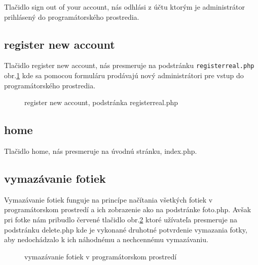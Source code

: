 Tlačidlo sign out of your account, nás odhlási z účtu ktorým je administrátor prihlásený do programátorského prostredia.

\pagebreak

\subsection{register new account}

Tlačidlo register new account, nás presmeruje na podstránku \verb|registerreal.php| obr.\ref{OBRAZOK 1.14} kde sa pomocou formuláru prodávajú nový administrátori pre vstup do programátorského prostredia.

\begin{figure}[!tbh]
\centering
\setlength{\fboxsep}{0pt}%
\setlength{\fboxrule}{1pt}%
\caption{register new account, podstránka registerreal.php}\label{OBRAZOK 1.14}
\end{figure}

\subsection{home}

Tlačidlo home, nás presmeruje na úvodnú stránku, index.php.

\subsection{vymazávanie fotiek}

Vymazávanie fotiek funguje na princípe načítania všetkých fotiek v programátorskom prostredí a ich zobrazenie ako na podstránke foto.php. Avšak pri fotke nám pribudlo červené tlačidlo obr.\ref{OBRAZOK 1.15} ktoré užívateľa presmeruje na podstránku delete.php kde je vykonané druhotné potvrdenie vymazania fotky, aby nedochádzalo k ich náhodnému a nechcennému vymazávaniu.

\begin{figure}[!tbh]
\centering
\setlength{\fboxsep}{0pt}%
\setlength{\fboxrule}{1pt}%
\caption{vymazávanie fotiek v programátorskom prostredí}\label{OBRAZOK 1.15}
\end{figure}